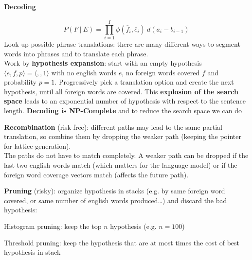 \documentclass[10pt]{report}
\begin{document}
\paragraph{Decoding}
$$P(F\:|\:E) = \prod_{i=1}^I\phi(\overline{f}_i, \overline{e}_i)\:d(a_i-b_{i-1})$$
Look up possible phrase translations: there are many different ways to segment words into phrases and to translate each phrase.\\
Work by \textbf{hypothesis expansion}: start with an empty hypothesis $\langle e,f,p\rangle = \langle , , 1\rangle$ with no english words $e$, no foreign words covered $f$ and probability $p = 1$. Progressively pick a translation option and create the next hypothesis, until all foreign words are covered. This \textbf{explosion of the search space} leads to an exponential number of hypothesis with respect to the sentence length. \textbf{Decoding is NP-Complete} and to reduce the search space we can do 
\begin{list}{}{}
	\item \textbf{Recombination} (risk free): different paths may lead to the same partial translation, so combine them by dropping the weaker path (keeping the pointer for lattice generation).\\
	The paths do not have to match completely. A weaker path can be dropped if the last two english words match (which matters for the language model) or if the foreign word coverage vectors match (affects the future path).
	\item \textbf{Pruning} (risky): organize hypothesis in stacks (e.g. by same foreign word covered, or same number of english words produced\ldots) and discard the bad hypothesis:
	\begin{list}{}{}
		\item Histogram pruning: keep the top $n$ hypothesis (e.g. $n=100$)
		\item Threshold pruning: keep the hypothesis that are at most times the cost of best hypothesis in stack
	\end{list}
\end{list}
\end{document}

